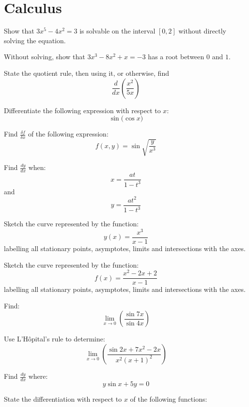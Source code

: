 \documentclass[12pt]{exam}
\begin{document}
\section{Calculus}
\begin{questions}

\question Show that $3x^5-4x^2=3$ is solvable on the interval $[0,2]$ without directly solving the equation.

\question Without solving, show that $3x^3-8x^2+x=-3$ has a root between $0$ and $1.$

\question State the quotient rule, then using it, or otherwise, find $$\frac{d}{dx}(\frac{x^2}{5x})$$

\question Differentiate the following expression with respect to $x$: $$\sin({\cos{x})}$$

\question Find $\frac{\delta f}{\delta x}$ of the following expression: $$f(x,y) = \sin\sqrt{{\frac{y}{x^3}}}$$

\question Find $\frac{dy}{dx}$ when: $$x=\frac{at}{1-t^3}$$ and $$y=\frac{at^2}{1-t^3}$$

\question Sketch the curve represented by the function:
$$y(x) = \frac{x^{3}}{x-1}$$ labelling all stationary points, asymptotes, limits and intersections with the axes.

\question Sketch the curve represented by the function:
$$f(x)=\frac{x^2-2x+2}{x-1}$$ labelling all stationary points, asymptotes, limits and intersections with the axes.

\question Find:
$$\lim_{x \to 0}(\frac{\sin{7x}}{\sin{4x}})$$

\question Use L'H\^{o}pital's rule to determine:
$$\lim_{x \to 0}(\frac{\sin{2x}+7x^{2}-2x}{x^{2}(x+1)^{2}})$$

\question Find $\frac{dy}{dx}$ where: $$y \sin{x} +5y = 0$$

\question State the differentiation with respect to $x$ of the following functions:



\end{questions}
\end{document}

